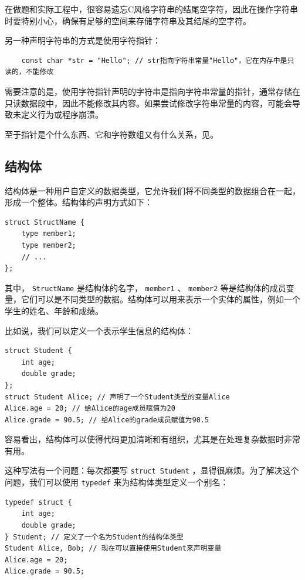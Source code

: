 在做题和实际工程中，很容易遗忘C风格字符串的结尾空字符，因此在操作字符串时要特别小心，确保有足够的空间来存储字符串及其结尾的空字符。

另一种声明字符串的方式是使用字符指针：
\begin{verbatim}
    const char *str = "Hello"; // str指向字符串常量"Hello"，它在内存中是只读的，不能修改
\end{verbatim}
需要注意的是，使用字符指针声明的字符串是指向字符串常量的指针，通常存储在只读数据段中，因此不能修改其内容。如果尝试修改字符串常量的内容，可能会导致未定义行为或程序崩溃。

至于指针是个什么东西、它和字符数组又有什么关系，见。

\subsection{结构体}

结构体是一种用户自定义的数据类型，它允许我们将不同类型的数据组合在一起，形成一个整体。结构体的声明方式如下：
\begin{verbatim}
struct StructName {
    type member1;
    type member2;
    // ...
};
\end{verbatim}
其中， \verb|StructName| 是结构体的名字， \verb|member1| 、 \verb|member2| 等是结构体的成员变量，它们可以是不同类型的数据。结构体可以用来表示一个实体的属性，例如一个学生的姓名、年龄和成绩。

比如说，我们可以定义一个表示学生信息的结构体：
\begin{verbatim}
struct Student {
    int age;
    double grade;
}; 
struct Student Alice; // 声明了一个Student类型的变量Alice
Alice.age = 20; // 给Alice的age成员赋值为20
Alice.grade = 90.5; // 给Alice的grade成员赋值为90.5
\end{verbatim}
容易看出，结构体可以使得代码更加清晰和有组织，尤其是在处理复杂数据时非常有用。

这种写法有一个问题：每次都要写 \verb|struct Student| ，显得很麻烦。为了解决这个问题，我们可以使用 \verb|typedef| 来为结构体类型定义一个别名：
\begin{verbatim}
typedef struct {
    int age;
    double grade;
} Student; // 定义了一个名为Student的结构体类型
Student Alice, Bob; // 现在可以直接使用Student来声明变量
Alice.age = 20;
Alice.grade = 90.5;
\end{verbatim}

